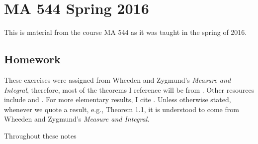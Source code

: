 
\section{MA 544 Spring 2016}
This is material from the course MA 544 as it was taught in the spring of
2016.%
\bigskip
\subsection{Homework}
These exercises were assigned from Wheeden and Zygmund's \emph{Measure and
  Integral}, therefore, most of the theorems I reference will be from
\cite{wheeden-zygmund}. Other resources include \cite{folland} and
\cite{royden}. For more elementary results, I cite \cite{rudin-1}. Unless
otherwise stated, whenever we quote a result, e.g., Theorem 1.1, it is
understood to come from Wheeden and Zygmund's \emph{Measure and Integral}.

\bigskip

Throughout these notes

